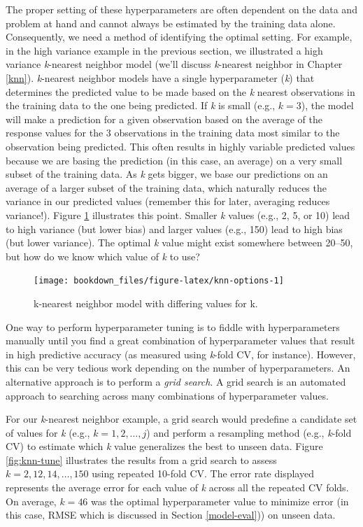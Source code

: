 \documentclass[]{krantz}
\begin{document}
The proper setting of these hyperparameters are often dependent on the data and problem at hand and cannot always be estimated by the training data alone. Consequently, we need a method of identifying the optimal setting. For example, in the high variance example in the previous section, we illustrated a high variance \emph{k}-nearest neighbor model (we'll discuss \emph{k}-nearest neighbor in Chapter \ref{knn}). \emph{k}-nearest neighbor models have a single hyperparameter (\emph{k}) that determines the predicted value to be made based on the \emph{k} nearest observations in the training data to the one being predicted. If \emph{k} is small (e.g., \(k=3\)), the model will make a prediction for a given observation based on the average of the response values for the 3 observations in the training data most similar to the observation being predicted. This often results in highly variable predicted values because we are basing the prediction (in this case, an average) on a very small subset of the training data. As \emph{k} gets bigger, we base our predictions on an average of a larger subset of the training data, which naturally reduces the variance in our predicted values (remember this for later, averaging reduces variance!). Figure \ref{fig:knn-options} illustrates this point. Smaller \emph{k} values (e.g., 2, 5, or 10) lead to high variance (but lower bias) and larger values (e.g., 150) lead to high bias (but lower variance). The optimal \emph{k} value might exist somewhere between 20--50, but how do we know which value of \emph{k} to use?

\begin{figure}

{\centering \texttt{[image: bookdown\_files/figure-latex/knn-options-1]} 

}

\caption{k-nearest neighbor model with differing values for k.}\label{fig:knn-options}
\end{figure}

One way to perform hyperparameter tuning is to fiddle with hyperparameters manually until you find a great combination of hyperparameter values that result in high predictive accuracy (as measured using \emph{k}-fold CV, for instance). However, this can be very tedious work depending on the number of hyperparameters. An alternative approach is to perform a \emph{grid search}. A grid search is an automated approach to searching across many combinations of hyperparameter values.

For our \emph{k}-nearest neighbor example, a grid search would predefine a candidate set of values for \emph{k} (e.g., \(k = 1, 2, \dots, j\)) and perform a resampling method (e.g., \emph{k}-fold CV) to estimate which \emph{k} value generalizes the best to unseen data. Figure \ref{fig:knn-tune} illustrates the results from a grid search to assess \(k = 2, 12, 14, \dots, 150\) using repeated 10-fold CV. The error rate displayed represents the average error for each value of \emph{k} across all the repeated CV folds. On average, \(k=46\) was the optimal hyperparameter value to minimize error (in this case, RMSE which is discussed in Section \ref{model-eval})) on unseen data.
\end{document}
